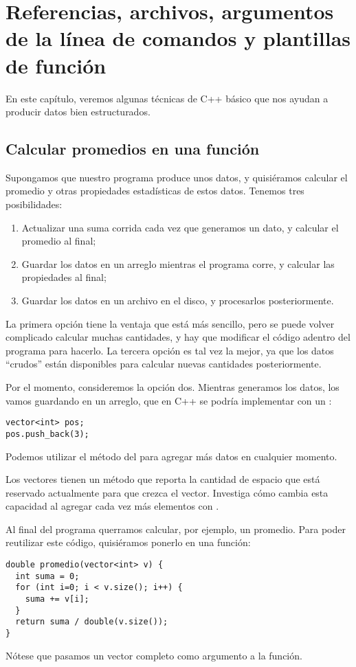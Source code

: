 \chapter{Referencias, archivos, argumentos de la línea de comandos y plantillas
de función}

En este capítulo, veremos algunas técnicas de C++ básico que nos ayudan a
producir datos bien estructurados.

\section{Calcular promedios en una función}
Supongamos que nuestro programa produce unos datos, y quisiéramos calcular el
promedio y otras propiedades estadísticas de estos datos. Tenemos tres
posibilidades:
\begin{enumerate}
\item Actualizar una suma corrida cada vez que generamos un dato, y calcular el
promedio al final;
\item Guardar los datos en un arreglo mientras el programa corre, y calcular
las propiedades al final;
\item Guardar los datos en un archivo en el disco, y procesarlos posteriormente.
\end{enumerate}

La primera opción tiene la ventaja que está más sencillo, pero se puede volver
complicado calcular muchas cantidades, y hay que modificar el código adentro
del programa para hacerlo. La tercera opción es tal vez la mejor, ya que los
datos ``crudos'' están disponibles para calcular nuevas cantidades
posteriormente.

Por el momento, consideremos la opción dos. Mientras generamos los datos, los
vamos guardando en un arreglo, que en C++ se podría implementar con un
:
\begin{lstlisting}
vector<int> pos;
pos.push_back(3);
\end{lstlisting}
Podemos utilizar el método  del  para agregar más
datos en cualquier momento.

\ejercicio
Los vectores tienen un método  que reporta la cantidad de
espacio que está reservado actualmente para que crezca el vector. Investiga
cómo cambia esta capacidad al agregar cada vez más elementos con
.

Al final del programa querramos calcular, por ejemplo, un promedio.
Para poder reutilizar este código, quisiéramos ponerlo en una función:
\begin{lstlisting}
double promedio(vector<int> v) {
  int suma = 0;
  for (int i=0; i < v.size(); i++) {
    suma += v[i];
  }
  return suma / double(v.size());
}
\end{lstlisting}
Nótese que pasamos un vector completo como argumento a la función.

